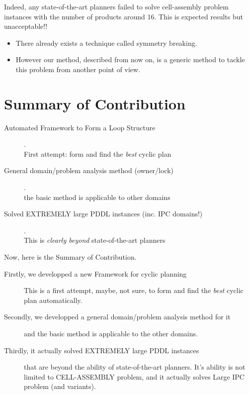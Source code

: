 \begin{resume}
Indeed, any state-of-the-art planners failed
to solve cell-assembly problem instances
with the number of products around 16.
This is expected results but unacceptable!!

\begin{itemize}
\item There already exists a technique called symmetry breaking.
\item However our method, described from now on, is a generic method
to tackle this problem from another point of view.
\end{itemize}
\end{resume}

\section{Summary of Contribution}
\label{sec-3}

\begin{description}
\item[{Automated Framework to Form a Loop Structure}] . \\
First attempt: form and find the \emph{best} cyclic plan
\item[{General domain/problem analysis method (owner/lock)}] . \\
the basic method is applicable to other domains
\item[{Solved EXTREMELY large PDDL instances (inc. IPC domains!)}] . \\
This is \emph{clearly beyond} state-of-the-art planners
\end{description}

\begin{resume}
Now, here is the Summary of Contribution.
\begin{description}
\item[{Firstly, we developped a new Framework for cyclic planning}] This is a first attempt, maybe, not sure,
to form and find the \emph{best} cyclic plan automatically.
\item[{Secondly, we developped a general domain/problem analysis method for it}] and the basic method is applicable to the other domains.
\item[{Thirdly, it actually solved EXTREMELY large PDDL instances}] that are beyond the ability of state-of-the-art planners.
It's ability is not limited to CELL-ASSEMBLY problem, and
it actually solves Large IPC problem (and variants).
\end{description}
\end{resume}

